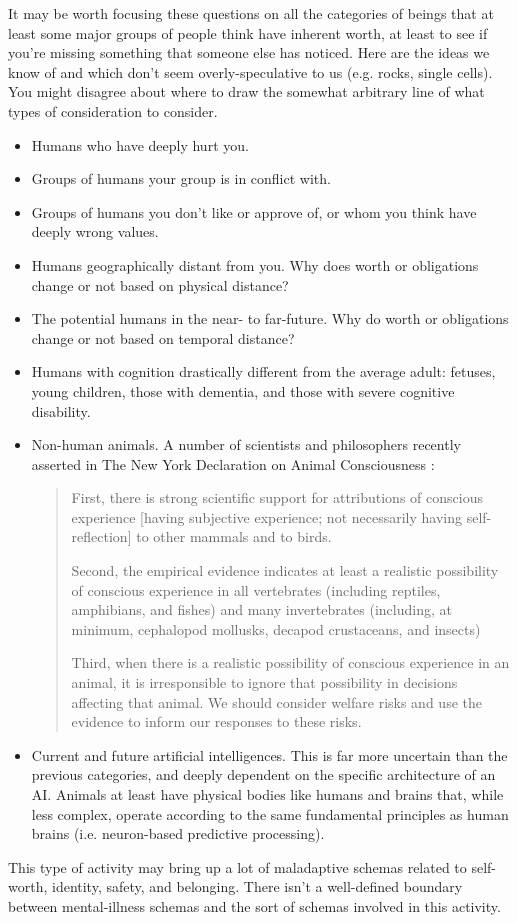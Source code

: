 \documentclass[12pt,letterpaper]{book}
\begin{document}
It may be worth focusing these questions on all the categories of beings that at least some major groups of people think have inherent worth, at least to see if you're missing something that someone else has noticed. Here are the ideas we know of and which don't seem overly-speculative to us (e.g. rocks, single cells). You might disagree about where to draw the somewhat arbitrary line of what types of consideration to consider.
\begin{itemize}
    \item Humans who have deeply hurt you.
    \item Groups of humans your group is in conflict with.
    \item Groups of humans you don't like or approve of, or whom you think have deeply wrong values.
    \item Humans geographically distant from you. Why does worth or obligations change or not based on physical distance?
    \item The potential humans in the near- to far-future. Why do worth or obligations change or not based on temporal distance?
    \item Humans with cognition drastically different from the average adult: fetuses, young children, those with dementia, and those with severe cognitive disability.
    \item Non-human animals. A number of scientists and philosophers recently asserted in The New York Declaration on Animal Consciousness \cite{newYorkAnimal}:
        \begin{quotation}
            First, there is strong scientific support for attributions of conscious experience [having subjective experience; not necessarily having self-reflection] to other mammals and to birds.
            
            Second, the empirical evidence indicates at least a realistic possibility of conscious experience in all vertebrates (including reptiles, amphibians, and fishes) and many invertebrates (including, at minimum, cephalopod mollusks, decapod crustaceans, and insects)

            Third, when there is a realistic possibility of conscious experience in an animal, it is irresponsible to ignore that possibility in decisions affecting that animal. We should consider welfare risks and use the evidence to inform our responses to these risks.
        \end{quotation}
    \item Current and future artificial intelligences. This is far more uncertain than the previous categories, and deeply dependent on the specific architecture of an AI. Animals at least have physical bodies like humans and brains that, while less complex, operate according to the same fundamental principles as human brains (i.e. neuron-based predictive processing).
\end{itemize}
This type of activity may bring up a lot of maladaptive schemas related to self-worth, identity, safety, and belonging. There isn't a well-defined boundary between mental-illness schemas and the sort of schemas involved in this activity.
\end{document}
